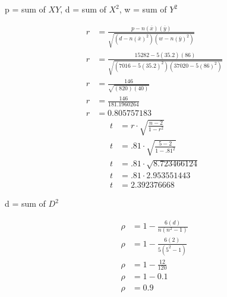 \documentclass{article}
\begin{document}
    \begin{center}
        p = sum of $XY$, d = sum of $X^2$, w = sum of $Y^2$
    \end{center}
    \begin{align*}
        r&=\frac{p-n(\overline{x})(\overline{y})}{\sqrt{(d-n(\overline{x})^2)(w-n(\overline{y})^2)}}\\
        r&=\frac{15282-5(35.2)(86)}{\sqrt{(7016-5(35.2)^2)(37020-5(86)^2)}}\\
        r&=\frac{146}{\sqrt{(820)(40)}}\\
        r&=\frac{146}{181.1960264}\\
        r&= 0.805757183
    \end{align*}
    \begin{align*}
        t&=r\cdot \sqrt{\frac{n-2}{1-r^2}}\\
        t&=.81\cdot \sqrt{\frac{5-2}{1-.81^2}}\\
        t&=.81\cdot \sqrt{8.723466124}\\
        t&=.81\cdot 2.953551443\\
        t&=2.392376668
    \end{align*}
    \begin{center}
        d = sum of $D^2$
    \end{center}
    \begin{align*}
        \rho&=1-\frac{6(d)}{n(n^2-1)}\\
        \rho&=1-\frac{6(2)}{5(5^2-1)}\\
        \rho&=1-\frac{12}{120}\\ 
        \rho&=1-0.1\\
        \rho&=0.9
    \end{align*}
\end{document}
